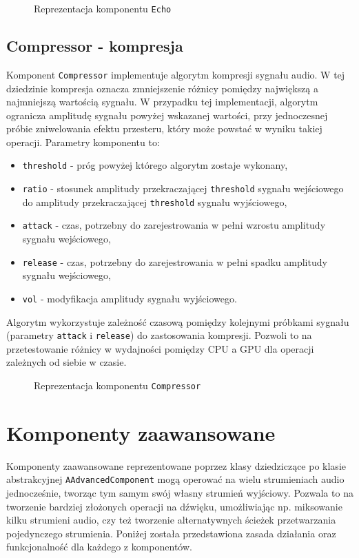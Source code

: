 \begin{figure}[H]
    \centering
    
    \caption{Reprezentacja komponentu \texttt{Echo}}
    \label{fig:Reprezentacja komponentu Echo}
\end{figure}

\subsection{Compressor - kompresja}
Komponent \texttt{Compressor} implementuje algorytm kompresji sygnału audio. W tej dziedzinie kompresja oznacza zmniejszenie różnicy pomiędzy największą a najmniejszą wartością sygnału. W przypadku tej implementacji, algorytm ogranicza amplitudę sygnału powyżej wskazanej wartości, przy jednoczesnej próbie zniwelowania efektu przesteru, który może powstać w wyniku takiej operacji. Parametry komponentu to:
\begin{itemize}
    \item \texttt{threshold} - próg powyżej którego algorytm zostaje wykonany,
    \item \texttt{ratio} - stosunek amplitudy przekraczającej \texttt{threshold} sygnału wejściowego do amplitudy przekraczającej \texttt{threshold} sygnału wyjściowego,
    \item \texttt{attack} - czas, potrzebny do zarejestrowania w pełni wzrostu amplitudy sygnału wejściowego,
    \item \texttt{release} - czas, potrzebny do zarejestrowania w pełni spadku amplitudy sygnału wejściowego,
    \item \texttt{vol} - modyfikacja amplitudy sygnału wyjściowego.
\end{itemize}
Algorytm wykorzystuje zależność czasową pomiędzy kolejnymi próbkami sygnału (parametry \texttt{attack} i \texttt{release}) do zastosowania kompresji. Pozwoli to na przetestowanie różnicy w wydajności pomiędzy CPU a GPU dla operacji zależnych od siebie w czasie.

\begin{figure}[H]
    \centering
    
    \caption{Reprezentacja komponentu \texttt{Compressor}}
    \label{fig:Reprezentacja komponentu Compressor}
\end{figure}

\section{Komponenty zaawansowane}
Komponenty zaawansowane reprezentowane poprzez klasy dziedziczące po klasie abstrakcyjnej \texttt{AAdvancedComponent} mogą operować na wielu strumieniach audio jednocześnie, tworząc tym samym swój własny strumień wyjściowy. Pozwala to na tworzenie bardziej złożonych operacji na dźwięku, umożliwiając np. miksowanie kilku strumieni audio, czy też tworzenie alternatywnych ścieżek przetwarzania pojedynczego strumienia. Poniżej została przedstawiona zasada działania oraz funkcjonalność dla każdego z komponentów.

